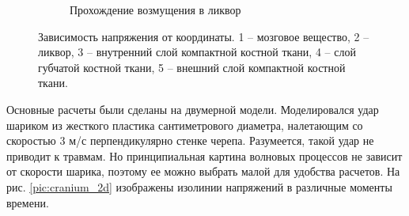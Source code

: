 \begin{figure}[h]
\begin{subfigure}[b]{0.6\textwidth}
\caption{Прохождение возмущения в ликвор}
\end{subfigure}
\caption{Зависимость напряжения от координаты. 1 -- мозговое вещество, 2 -- ликвор, 3 -- внутренний слой компактной костной ткани, 4 -- слой губчатой костной ткани, 5 -- внешний слой компактной костной ткани.}
\label{pic:cranium_1d}
\end{figure}

Основные расчеты были сделаны на двумерной модели. Моделировался удар шариком из жесткого пластика сантиметрового диаметра, налетающим со скоростью 3 м/с перпендикулярно стенке черепа. Разумеется, такой удар не приводит к травмам. Но принципиальная картина волновых процессов не зависит от скорости шарика, поэтому ее можно выбрать малой для удобства расчетов. На рис. \ref{pic:cranium_2d} изображены изолинии напряжений в различные моменты времени.

